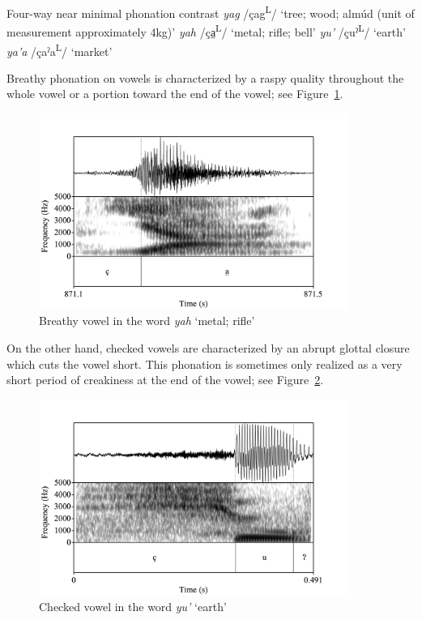 \documentclass[12pt, letterpaper]{article}
\newcommand{\supr}[1]{\textsuperscript{#1}}
\begin{document}
\ea \label{ex:YA} Four-way near minimal phonation contrast
    \ea \textit{yag}  /çag\supr{L}/ `tree; wood; almúd (unit of measurement approximately 4kg)'
    \ex \textit{yah}  /ça̤\supr{L}/ `metal; rifle; bell'
    \ex \textit{yu'}  /çuˀ\supr{L}/  `earth'
    \ex \textit{ya'a}  /çaˀa\supr{L}/  `market'
    \z 
\z 




Breathy phonation on vowels is characterized by a raspy quality throughout the whole vowel or a portion toward the end of the vowel; see Figure~\ref{fig:BreathyVowel}. 

\begin{figure}[!h]
	\centering
	\includegraphics[width=0.9\textwidth]{Images/yah.png}
	\caption{Breathy vowel in the word \textit{yah} `metal; rifle'}
	\label{fig:BreathyVowel}
\end{figure}

On the other hand, checked vowels are characterized by an abrupt glottal closure which cuts the vowel short. This phonation is sometimes only realized as a very short period of creakiness at the end of the vowel; see Figure~\ref{fig:CheckedVowel}.  

\begin{figure}[!h]
	\centering
	\includegraphics[width=0.9\textwidth]{Images/RD_yu'.png}
	\caption{Checked vowel in the word \textit{yu'} `earth'}
	\label{fig:CheckedVowel}
\end{figure}
\end{document}
